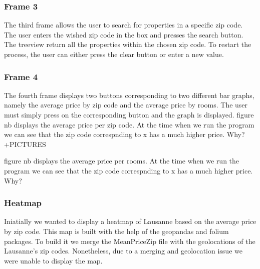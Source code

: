 \documentclass[main]{subfiles}
\begin{document}
\subsubsection{Frame 3}
The third frame allows the user to search for properties in a specific zip code. 
The user enters the wished zip code in the box and presses the search button. 
The treeview return all the properties within the chosen zip code. 
To restart the process, the user can either press the clear button or enter a new value.

\subsubsection{Frame 4}
The fourth frame displays two buttons corresponding to two different bar graphs, 
namely the average price by zip code and the average price by rooms.
The user must simply press on the corresponding button and the graph is displayed. 
figure nb displays the average price per zip code. At the time when we run the program we can see that the zip code correspnding to x
has a much higher price. Why?+PICTURES

figure nb displays the average price per rooms. At the time when we run the program we can see that the zip code correspnding to x
has a much higher price. Why?

\subsubsection{Heatmap}
Iniatially we wanted to display a heatmap of Lausanne based on the average price by zip code. 
This map is built with the help of the geopandas and folium packages. 
To build it we merge the MeanPriceZip file with the geolocations of the Lausanne's zip codes. Nonetheless, 
due to a merging and geolocation issue we were unable to display the map. 
\end{document}
